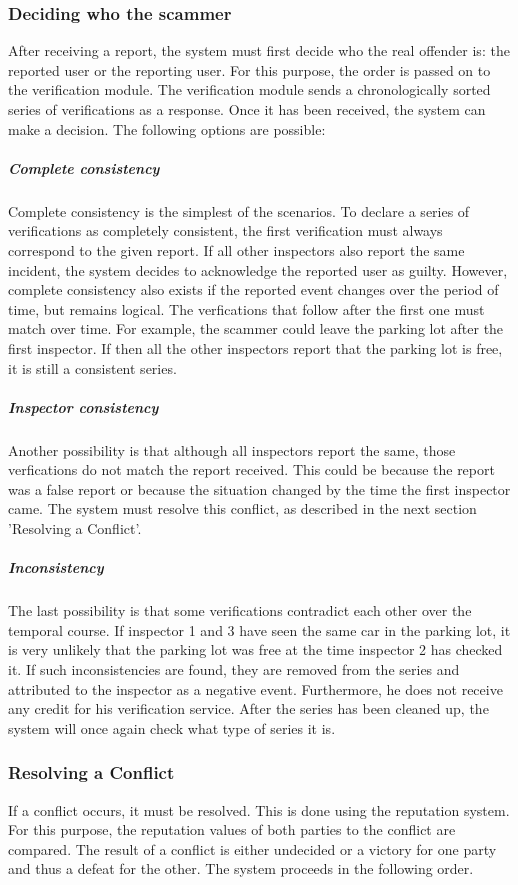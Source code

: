 \documentclass[
a4paper,     %
titlepage,   %
14pt         %
]{scrartcl}  %
\theoremstyle{mystyle}
\begin{document}
\subsubsection{Deciding who the scammer} After receiving a report, the system must first decide who the real offender is: the reported user or the reporting user. For this purpose, the order is passed on to the verification module. The verification module sends a chronologically sorted series of verifications as a response. Once it has been received, the system can make a decision. The following options are possible:

\subparagraph{Complete consistency} Complete consistency is the simplest of the scenarios. To declare a series of verifications as completely consistent, the first verification must always correspond to the given report. If all other inspectors also report the same incident, the system decides to acknowledge the reported user as guilty. However, complete consistency also exists if the reported event changes over the period of time, but remains logical. The verfications that follow after the first one must match over time. For example, the scammer could leave the parking lot after the first inspector. If then all the other inspectors report that the parking lot is free, it is still a consistent series.

\subparagraph{Inspector consistency} Another possibility is that although all inspectors report the same, those verfications do not match the report received. This could be because the report was a false report or because the situation changed by the time the first inspector came. The system must resolve this conflict, as described in the next section 'Resolving a Conflict'.

\subparagraph{Inconsistency} The last possibility is that some verifications contradict each other over the temporal course. If inspector 1 and 3 have seen the same car in the parking lot, it is very unlikely that the parking lot was free at the time inspector 2 has checked it. If such inconsistencies are found, they are removed from the series and attributed to the inspector as a negative event. Furthermore, he does not receive any credit for his verification service. After the series has been cleaned up, the system will once again check what type of series it is.

\subsubsection{Resolving a Conflict} If a conflict occurs, it must be resolved. This is done using the reputation system. For this purpose, the reputation values of both parties to the conflict are compared. The result of a conflict is either undecided or a victory for one party and thus a defeat for the other. The system proceeds in the following order.
\end{document}
